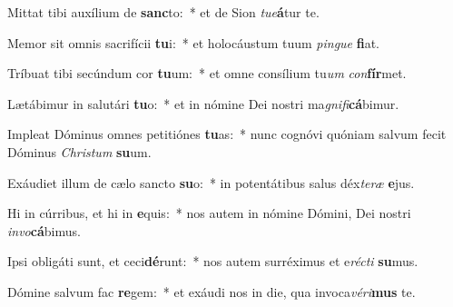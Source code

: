 \item Mittat tibi auxílium de \textbf{sanc}to:~* et de Sion \textit{tu}\textit{e}\textbf{á}tur te.
\item Memor sit omnis sacrifícii \textbf{tu}i:~* et holocáustum tuum \textit{pin}\textit{gue} \textbf{fi}at.
\item Tríbuat tibi secúndum cor \textbf{tu}um:~* et omne consílium tu\textit{um} \textit{con}\textbf{fír}met.
\item Lætábimur in salutári \textbf{tu}o:~* et in nómine Dei nostri ma\textit{gni}\textit{fi}\textbf{cá}bimur.
\item Impleat Dóminus omnes petitiónes \textbf{tu}as:~* nunc cognóvi quóniam salvum fecit Dóminus \textit{Chris}\textit{tum} \textbf{su}um.
\item Exáudiet illum de cælo sancto \textbf{su}o:~* in potentátibus salus déx\textit{te}\textit{ræ} \textbf{e}jus.
\item Hi in cúrribus, et hi in \textbf{e}quis:~* nos autem in nómine Dómini, Dei nostri \textit{in}\textit{vo}\textbf{cá}bimus.
\item Ipsi obligáti sunt, et ceci\textbf{dé}runt:~* nos autem surréximus et e\textit{réc}\textit{ti} \textbf{su}mus.
\item Dómine salvum fac \textbf{re}gem:~* et exáudi nos in die, qua invoca\textit{vé}\textit{ri}\textbf{mus} te.
